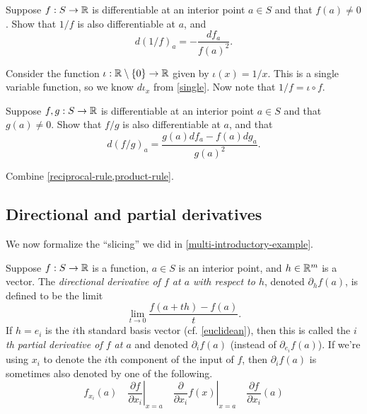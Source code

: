 \begin{exercise} \label{reciprocal-rule}
	Suppose $f : S \to \mathbb{R}$ is differentiable at an interior point $a \in S$ and that $f(a) \neq 0$. Show that $1/f$ is also differentiable at $a$, and
	\[ d(1/f)_a = -\frac{df_a}{f(a)^2}.  \]
	\begin{hint}
		Consider the function $\iota : \mathbb{R} \setminus \{0\} \to \mathbb{R}$ given by $\iota(x) = 1/x$. This is a single variable function, so we know $d\iota_x$ from \cref{single}. Now note that $1/f = \iota \circ f$. 
	\end{hint}
\end{exercise}

\begin{exercise} \label{quotient-rule} 
	Suppose $f, g : S \to \mathbb{R}$ is differentiable at an interior point $a \in S$ and that $g(a) \neq 0$. Show that $f/g$ is also differentiable at $a$, and that
	\[ d(f/g)_a = \frac{g(a)df_a - f(a)dg_a}{g(a)^2}. \]
	\begin{hint}
		Combine \cref{reciprocal-rule,product-rule}. 
	\end{hint}
\end{exercise}

\subsection{Directional and partial derivatives}

We now formalize the ``slicing'' we did in \cref{multi-introductory-example}. 

\begin{definition}  
	Suppose $f : S \to \mathbb{R}$ is a function, $a \in S$ is an interior point, and $h \in \mathbb{R}^m$ is a vector. The \emph{directional derivative of $f$ at $a$ with respect to $h$}, denoted $\partial_h f(a)$, is defined to be the limit
	\[ \lim_{t \to 0} \frac{f(a+th) - f(a)}{t}. \]
	If $h = e_i$ is the $i$th standard basis vector (cf. \cref{euclidean}), then this is called the \emph{$i$th partial derivative of $f$ at $a$} and denoted $\partial_i f(a)$ (instead of $\partial_{e_i} f(a)$). If we're using $x_i$ to denote the $i$th component of the input of $f$, then $\partial_i f(a)$ is sometimes also denoted by one of the following. 
	\[ f_{x_i}(a) \quad \left. \frac{\partial f}{\partial x_i}\right|_{x = a} \quad \left.\frac{\partial}{\partial x_i} f(x)\right|_{x = a} \quad \frac{\partial f}{\partial x_i}(a) \]
\end{definition}

